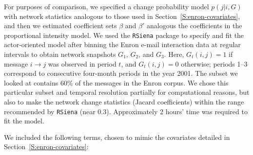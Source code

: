 \documentclass[final]{statsoc}
\begin{document}
For purposes of comparison, we specified a change probability model $p(j | i,
G)$ with network statistics analogous to those used in
Section~\ref{S:enron-covariates}, and then we estimated coefficient sets
$\beta$ and $\beta'$ analogous the coefficients in the proportional intensity
model.  We used the \texttt{RSiena} package \citep{rsiena2011} to specify and
fit the actor-oriented model after binning the Enron e-mail interaction data
at regular intervals to obtain network snapshots $G_1$, $G_2$, and $G_3$.
Here, $G_t(i,j) = 1$ if message $i \to j$ was observed in period $t$, and
$G_t(i,j) = 0$ otherwise; periods 1--3 correspond to consecutive four-month
periods in the year 2001.   The subset we looked at contains 60\% of the
messages in the Enron corpus.  We chose this particular subset and temporal
resolution partially for computational reasons, but also to make the network
change statistics (Jacard coefficients) within the range recommended by
\texttt{RSiena} (near $0.3$).  Approximately 2 hours' time was required to fit
the model.

We included the following terms, chosen to mimic the covariates detailed in Section~\ref{S:enron-covariates}:
\end{document}
